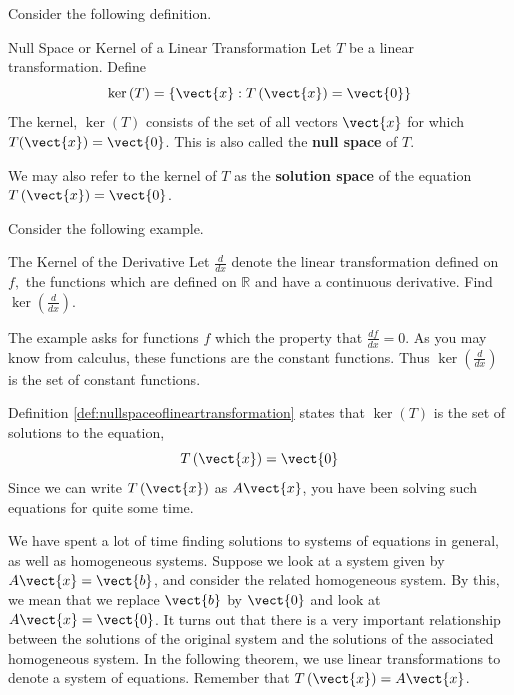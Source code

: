 Consider the following definition.

\begin{definition}{Null Space or Kernel of a Linear Transformation}\label{def:nullspaceoflineartransformation}
Let $T$ be a linear transformation. Define
\begin{equation*}
\ker \left( T\right) = \left\{ \vect{x}:T \left(\vect{x} \right)= \vect{0} \right\} 
\end{equation*}
The kernel,  $\ker \left( T\right) $ consists of the set of all vectors $\vect{x}$ for which
$T (\vect{x}) = \vect{0}$. This is also called the
 \textbf{null space} of $T$. 
\end{definition}

We may also refer to the kernel of $T$ as the
\textbf{solution space }of the equation $T \left(\vect{x}\right) = \vect{0}$.

Consider the following example.

\begin{example}{The Kernel of the Derivative}\label{exa:kernelderivative}
Let $\frac{d}{dx}$ denote the linear transformation defined on $f,$ the functions
which are defined on $\mathbb{R}$ and have a continuous derivative. Find 
$\ker \left( \frac{d}{dx}\right) .$
\end{example}

\begin{solution} The example asks for functions $f$ which the property that $\frac{df}{dx}
=0. $ As you may know from calculus, these functions are the constant functions.
Thus $\ker \left( \frac{d}{dx}\right)$ is the set of constant functions.
\end{solution} 

Definition \ref{def:nullspaceoflineartransformation} states that $\ker \left( T\right) $ is the set of
solutions to the equation,
\begin{equation*}
T\left( \vect{x} \right) = \vect{0}
\end{equation*}
Since we can write $T\left( \vect{x} \right)$ as $A\vect{x}$, you have been solving such
equations for quite some time.

We have spent a lot of time finding solutions to systems of equations in general, as well as
homogeneous systems. Suppose we look at a system given by $A\vect{x}=\vect{b}$, and consider the 
related homogeneous system. By this, we mean that we replace $\vect{b}$ by $\vect{0}$ and look at $A\vect{x}=\vect{0}$. 
It turns out that there is a very important relationship between the solutions of the original
system and the solutions of the associated homogeneous system. In the following 
theorem, we use linear transformations to denote a system of equations. Remember that
$T\left(\vect{x}\right) = A\vect{x}$.

